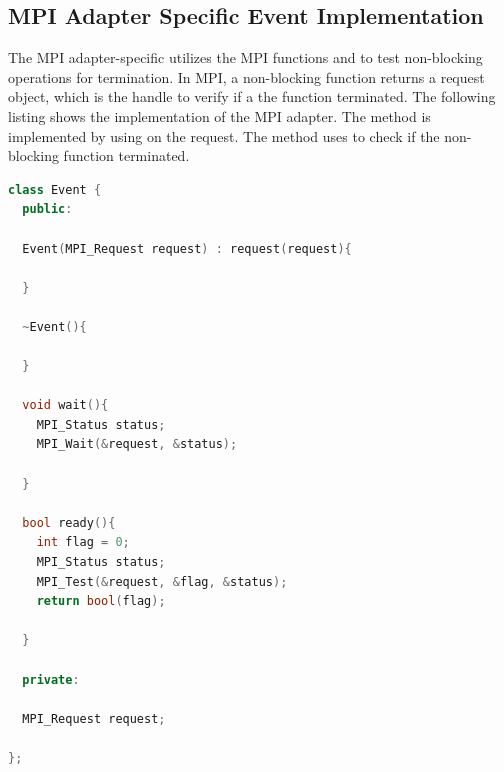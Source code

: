 \subsection{MPI Adapter Specific Event Implementation}
The MPI adapter-specific  utilizes the MPI functions
 and  to test non-blocking operations
for termination. In MPI, a non-blocking function returns a request
object, which is the handle to verify if a the function
terminated. The following listing shows the  implementation
of the MPI adapter.  The  method is implemented by using
 on the request. The  method uses
 to check if the non-blocking function terminated.

\begin{minipage}[t]{\textwidth} 
  \begin{lstlisting}[language=C++, label=lst:mpi_event, caption={MPI adapter-specific \cpp{Event} implementation. Non-blocking MPI operations can be handled by an \cpp{MPI\_Request} object. The \cpp{wait()} method waits until the communication operation terminated
    with \cpp{MPI\_Wait}. The \cpp{ready()} method checks if the communication operation terminated with \cpp{MPI\_Test}.}]
class Event {
  public:

  Event(MPI_Request request) : request(request){
    
  }
  
  ~Event(){
    
  }

  void wait(){
    MPI_Status status;
    MPI_Wait(&request, &status);
    
  }

  bool ready(){
    int flag = 0;
    MPI_Status status;
    MPI_Test(&request, &flag, &status);
    return bool(flag);
    
  }
  
  private:
  
  MPI_Request request;
  
};  
\end{lstlisting}
\end{minipage}

